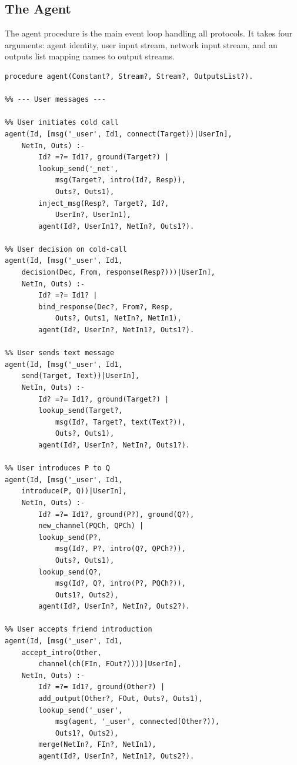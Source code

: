 \subsection{The Agent}
\label{app:agent}

The agent procedure is the main event loop handling all protocols. It takes four arguments: agent identity, user input stream, network input stream, and an outputs list mapping names to output streams.

\begin{verbatim}
procedure agent(Constant?, Stream?, Stream?, OutputsList?).

%% --- User messages ---

%% User initiates cold call
agent(Id, [msg('_user', Id1, connect(Target))|UserIn],
    NetIn, Outs) :-
        Id? =?= Id1?, ground(Target?) |
        lookup_send('_net',
            msg(Target?, intro(Id?, Resp)),
            Outs?, Outs1),
        inject_msg(Resp?, Target?, Id?,
            UserIn?, UserIn1),
        agent(Id?, UserIn1?, NetIn?, Outs1?).

%% User decision on cold-call
agent(Id, [msg('_user', Id1,
    decision(Dec, From, response(Resp?)))|UserIn],
    NetIn, Outs) :-
        Id? =?= Id1? |
        bind_response(Dec?, From?, Resp,
            Outs?, Outs1, NetIn?, NetIn1),
        agent(Id?, UserIn?, NetIn1?, Outs1?).

%% User sends text message
agent(Id, [msg('_user', Id1,
    send(Target, Text))|UserIn],
    NetIn, Outs) :-
        Id? =?= Id1?, ground(Target?) |
        lookup_send(Target?,
            msg(Id?, Target?, text(Text?)),
            Outs?, Outs1),
        agent(Id?, UserIn?, NetIn?, Outs1?).

%% User introduces P to Q
agent(Id, [msg('_user', Id1,
    introduce(P, Q))|UserIn],
    NetIn, Outs) :-
        Id? =?= Id1?, ground(P?), ground(Q?),
        new_channel(PQCh, QPCh) |
        lookup_send(P?,
            msg(Id?, P?, intro(Q?, QPCh?)),
            Outs?, Outs1),
        lookup_send(Q?,
            msg(Id?, Q?, intro(P?, PQCh?)),
            Outs1?, Outs2),
        agent(Id?, UserIn?, NetIn?, Outs2?).

%% User accepts friend introduction
agent(Id, [msg('_user', Id1,
    accept_intro(Other,
        channel(ch(FIn, FOut?))))|UserIn],
    NetIn, Outs) :-
        Id? =?= Id1?, ground(Other?) |
        add_output(Other?, FOut, Outs?, Outs1),
        lookup_send('_user',
            msg(agent, '_user', connected(Other?)),
            Outs1?, Outs2),
        merge(NetIn?, FIn?, NetIn1),
        agent(Id?, UserIn?, NetIn1?, Outs2?).


\end{verbatim}
